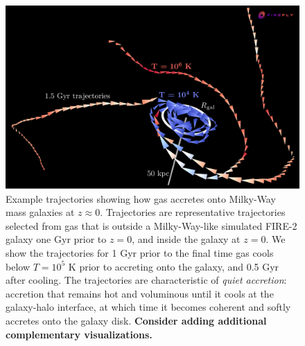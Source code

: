 \documentclass[fleqn,usenatbib]{mnras}
\begin{document}
\begin{figure}
    \centering
    \includegraphics[width=\columnwidth]{figures/illustrative_tracks/illustrative_tracks.png}
    \caption{
Example trajectories showing how gas accretes onto Milky-Way mass galaxies at $z\approx0$.
Trajectories are representative trajectories selected from gas that is outside a Milky-Way-like simulated FIRE-2 galaxy one Gyr prior to $z=0$, and inside the galaxy at $z=0$.
We show the trajectories for 1 Gyr prior to the final time gas cools below $T=10^5$ K prior to accreting onto the galaxy, and 0.5 Gyr after cooling.
The trajectories are characteristic of \textit{quiet accretion}:
accretion that remains hot and voluminous until it cools at the galaxy-halo interface, at which time it becomes coherent and softly accretes onto the galaxy disk.
\textbf{
Consider adding additional complementary visualizations.
    }
    }
    \label{f: overview}
\end{figure}
\end{document}
